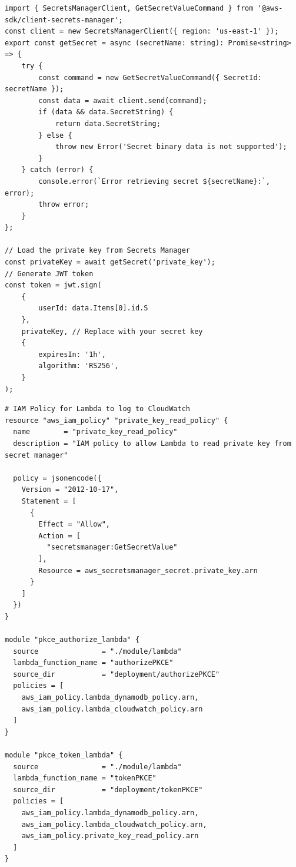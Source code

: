 \newpage

\begin{lstlisting}[style=typescript,caption=Token Signature using Assymetric key with RS256 stored in Secrets Manager,label=apendix:token_signing]
import { SecretsManagerClient, GetSecretValueCommand } from '@aws-sdk/client-secrets-manager';
const client = new SecretsManagerClient({ region: 'us-east-1' });
export const getSecret = async (secretName: string): Promise<string> => {
    try {
        const command = new GetSecretValueCommand({ SecretId: secretName });
        const data = await client.send(command);
        if (data && data.SecretString) {
            return data.SecretString;
        } else {
            throw new Error('Secret binary data is not supported');
        }
    } catch (error) {
        console.error(`Error retrieving secret ${secretName}:`, error);
        throw error;
    }
};

// Load the private key from Secrets Manager
const privateKey = await getSecret('private_key');
// Generate JWT token
const token = jwt.sign(
    {
        userId: data.Items[0].id.S
    },
    privateKey, // Replace with your secret key
    {
        expiresIn: '1h',
        algorithm: 'RS256',
    }
);

\end{lstlisting}


\begin{lstlisting}[caption={Terraform For Least Privilidge}, label={apendix:least_privilidge}]
# IAM Policy for Lambda to log to CloudWatch
resource "aws_iam_policy" "private_key_read_policy" {
  name        = "private_key_read_policy"
  description = "IAM policy to allow Lambda to read private key from secret manager"

  policy = jsonencode({
    Version = "2012-10-17",
    Statement = [
      {
        Effect = "Allow",
        Action = [
          "secretsmanager:GetSecretValue"
        ],
        Resource = aws_secretsmanager_secret.private_key.arn
      }
    ]
  })
}

module "pkce_authorize_lambda" {
  source               = "./module/lambda"
  lambda_function_name = "authorizePKCE"
  source_dir           = "deployment/authorizePKCE"
  policies = [
    aws_iam_policy.lambda_dynamodb_policy.arn,
    aws_iam_policy.lambda_cloudwatch_policy.arn
  ]
}

module "pkce_token_lambda" {
  source               = "./module/lambda"
  lambda_function_name = "tokenPKCE"
  source_dir           = "deployment/tokenPKCE"
  policies = [
    aws_iam_policy.lambda_dynamodb_policy.arn,
    aws_iam_policy.lambda_cloudwatch_policy.arn,
    aws_iam_policy.private_key_read_policy.arn
  ]
}
\end{lstlisting}

